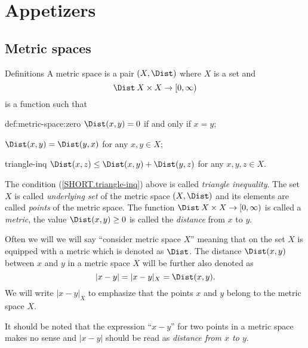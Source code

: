 \chapter{Appetizers}\label{chap:metr}

\section{Metric spaces}

\begin{thm}{Definitions}
\label{def:metric-space}
A metric space is a pair $(X,\Dist)$ where $X$ is a set and 
$$\Dist \: X \times X \rightarrow [0,\infty)$$
is a function such that 

\begin{subthm}{def:metric-space:zero}
$\Dist(x,y) = 0$ if and only if $x=y$;
\end{subthm}

\begin{subthm}{}
$\Dist(x,y) = \Dist(y,x)$ for any $x, y \in X$;
\end{subthm}

\begin{subthm}{triangle-inq}
$\Dist(x,z)\le \Dist(x,y)+\Dist(y,z)$ for any $x, y, z \in X$.
\end{subthm}

\end{thm}

The condition (\ref{SHORT.triangle-inq}) above is called \emph{triangle inequality}.
The set $X$ is called \emph{underlying set} of the metric space $(X,\Dist)$
and its elements are called \emph{points} of the metric space.
The function $\Dist\: X \times X \rightarrow [0,\infty)$ is called a \emph{metric}, 
the value $\Dist(x,y)\ge 0$ is called the \emph{distance} from $x$ to $y$.

Often we will we will say ``consider metric space $X$'' meaning that on the set $X$ is equipped with a metric  which is denoted as $\Dist$.
The distance $\Dist(x,y)$ between $x$ and $y$ in a metric space $X$ will be further also denoted as 
$$|x-y|=|x-y|_X=\Dist(x,y).$$
We will write $|x-y|_X$ to emphasize that the points $x$ and $y$ belong to the metric space $X$.

It should be noted that the expression ``$x-y$'' for two points in a metric space makes no sense
and $|x-y|$ should be read as \emph{distance from $x$ to $y$}.

